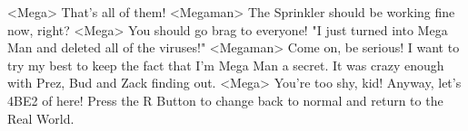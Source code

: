 <Mega> That's all of them! 
<Megaman> The Sprinkler should be working fine now, right? 
<Mega> You should go brag to everyone! 
"I just turned into Mega Man and deleted all of the viruses!" 
<Megaman> Come on, be serious! 
I want to try my best to keep the fact that I'm Mega Man a secret. 
It was crazy enough with Prez, Bud and Zack finding out. 
<Mega> You're too shy, kid! 
Anyway, let's {4B}{E2} of here! 
Press the R Button to change back to normal and return to the Real World. 
